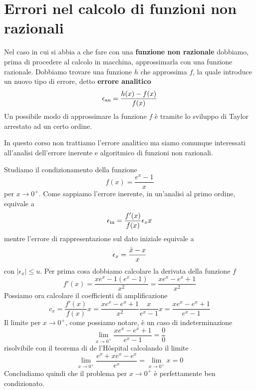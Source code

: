 \section{Errori nel calcolo di funzioni non razionali}
Nel caso in cui si abbia a che fare con una \textbf{funzione non razionale} dobbiamo, prima di
procedere al calcolo in macchina, approssimarla con una funzione razionale. Dobbiamo trovare una
funzione $h$ che approssima $f$, la quale introduce un nuovo tipo di errore, detto
\textbf{errore analitico}
\[ \epsilon_\text{an} = \frac{h(x) - f(x)}{f(x)} \]
Un possibile modo di approssimare la funzione $f$ è tramite lo sviluppo di Taylor arrestato ad un certo ordine.

In questo corso non trattiamo l'errore analitico ma siamo comunque interessati all'analisi dell'errore inerente
e algoritmico di funzioni non razionali.

\begin{example}
	Studiamo il condizionamento della funzione
	\[ f(x) = \frac{e^x - 1}{x} \]
	per $x \to 0^+$. Come sappiamo l'errore inerente, in un'analisi al primo ordine, equivale a
	\[ \epsilon_\text{in} = \frac{f'(x)}{f(x)} \epsilon_x x \]
	mentre l'errore di rappresentazione sul dato iniziale equivale a
	\[ \epsilon_x = \frac{\tilde{x} - x}{x} \]
	con $|\epsilon_x| \leq u$. Per prima cosa dobbiamo calcolare la derivata della funzione $f$
	\[ f'(x) = \frac{x e^x - 1 (e^x - 1)}{x^2} = \frac{x e^x - e^x + 1}{x^2} \]
	Possiamo ora calcolare il coefficienti di amplificazione
	\[
		c_x = \frac{f'(x)}{f(x)} x =
		\frac{x e^x - e^x + 1}{x^2} \frac{x}{e^x - 1} x =
		\frac{x e^x - e^x + 1}{e^x - 1}
	\]
	Il limite per $x \to 0^+$, come possiamo notare, è un caso di indeterminazione
	\[ \lim_{x \to 0^+} \frac{x e^x - e^x + 1}{e^x - 1} = \frac{0}{0} \]
	risolvibile con il teorema di de l'H\^ospital calcolando il limite
	\[ \lim_{x \to 0^+} \frac{e^x + x e^x - e^x}{e^x} = \lim_{x \to 0^+} x = 0 \]
	Concludiamo quindi che il problema per $x \to 0^+$ è perfettamente ben condizionato.
\end{example}

